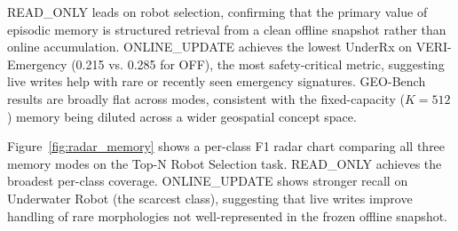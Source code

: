 READ\_ONLY leads on robot selection, confirming that the primary value of episodic memory is structured retrieval from a clean offline snapshot rather than online accumulation. ONLINE\_UPDATE achieves the lowest UnderRx on VERI-Emergency (0.215 vs. 0.285 for OFF), the most safety-critical metric, suggesting live writes help with rare or recently seen emergency signatures. GEO-Bench results are broadly flat across modes, consistent with the fixed-capacity ($K{=}512$) memory being diluted across a wider geospatial concept space.

Figure~\ref{fig:radar_memory} shows a per-class F1 radar chart comparing all three memory modes on the Top-N Robot Selection task. READ\_ONLY achieves the broadest per-class coverage. ONLINE\_UPDATE shows stronger recall on Underwater Robot (the scarcest class), suggesting that live writes improve handling of rare morphologies not well-represented in the frozen offline snapshot.

